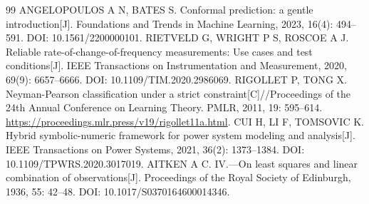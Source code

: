 \documentclass[UTF8,a4paper,11pt]{ctexart}
\begin{document}
\begin{thebibliography}{99}
 ANGELOPOULOS A N, BATES S. Conformal prediction: a gentle introduction[J]. Foundations and Trends in Machine Learning, 2023, 16(4): 494–591. DOI: 10.1561/2200000101.
 RIETVELD G, WRIGHT P S, ROSCOE A J. Reliable rate-of-change-of-frequency measurements: Use cases and test conditions[J]. IEEE Transactions on Instrumentation and Measurement, 2020, 69(9): 6657--6666. DOI: 10.1109/TIM.2020.2986069.
 RIGOLLET P, TONG X. Neyman-Pearson classification under a strict constraint[C]//Proceedings of the 24th Annual Conference on Learning Theory. PMLR, 2011, 19: 595--614. \url{https://proceedings.mlr.press/v19/rigollet11a.html}.
 CUI H, LI F, TOMSOVIC K. Hybrid symbolic-numeric framework for power system modeling and analysis[J]. IEEE Transactions on Power Systems, 2021, 36(2): 1373--1384. DOI: 10.1109/TPWRS.2020.3017019.
 AITKEN A C. IV.—On least squares and linear combination of observations[J]. Proceedings of the Royal Society of Edinburgh, 1936, 55: 42--48. DOI: 10.1017/S0370164600014346.

\end{thebibliography}
\end{document}
